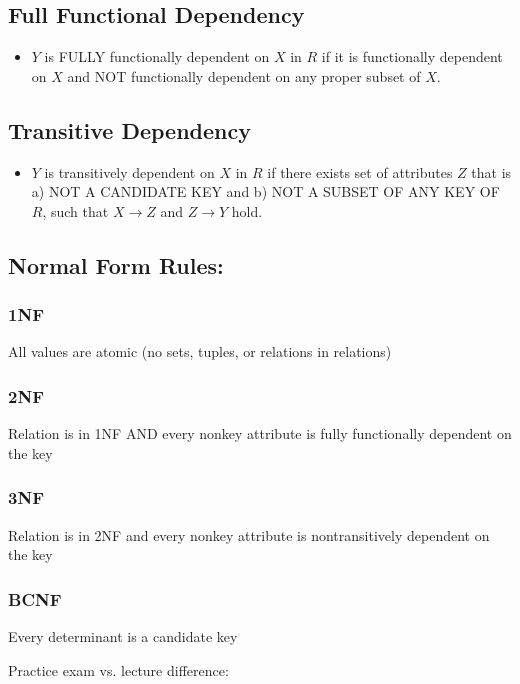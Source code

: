 \documentclass[11pt]{article}
\begin{document}
\subsection{Full Functional Dependency}
\label{sec:org0fd9761}
\begin{itemize}
\item \(Y\) is FULLY functionally dependent on \(X\) in \(R\) if it is functionally
dependent on \(X\) and NOT functionally dependent on any proper subset of
\(X\).
\end{itemize}

\subsection{Transitive Dependency}
\label{sec:orge979657}
\begin{itemize}
\item \(Y\) is transitively dependent on \(X\) in \(R\) if there exists set of
attributes \(Z\) that is a) NOT A CANDIDATE KEY and b) NOT A SUBSET OF
ANY KEY OF \(R\), such that \(X \to Z\) and \(Z \to Y\) hold.
\end{itemize}


\subsection{Normal Form Rules:}
\label{sec:orgcc52147}
\subsubsection{1NF}
\label{sec:orgbb4fcfd}
All values are atomic (no sets, tuples, or relations in relations)
\subsubsection{2NF}
\label{sec:org5a4b8d4}
Relation is in 1NF AND every nonkey attribute is fully functionally
dependent on the key
\subsubsection{3NF}
\label{sec:orgde76511}
Relation is in 2NF and every nonkey attribute is nontransitively dependent
on the key
\subsubsection{BCNF}
\label{sec:orga46adb6}
Every determinant is a candidate key

Practice exam vs. lecture difference:
\end{document}
